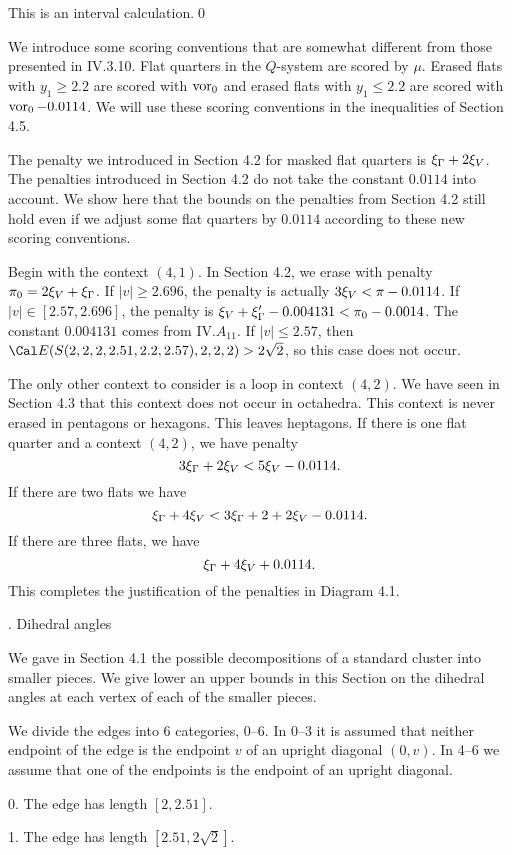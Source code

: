  This is an interval calculation.\qed\enddemo

We introduce some scoring conventions that are somewhat different
from those presented in IV.3.10.
Flat quarters in the $Q$-system are scored by $\mu$.  Erased
flats with $y_1\ge 2.2$ are scored with $\operatorname{vor}_0$ and erased
flats with $y_1\le 2.2$ are scored with $\operatorname{vor}_0-0.0114$.
We will use these scoring conventions in the inequalities of
Section 4.5.

The penalty we introduced in Section 4.2 for masked flat quarters
is $\xi_\Gamma+2\xi_V$.  The penalties introduced in Section 4.2 do not
take the constant $0.0114$ into account.  We show here that the
bounds on the penalties from Section 4.2 still hold even if we
adjust some flat quarters by $0.0114$ according to these new
scoring conventions.  

Begin with the context $(4,1)$. In Section 4.2, we erase with
penalty $\pi_0=2\xi_V+\xi_\Gamma$.
If $|v|\ge 2.696$, the penalty is actually
$3\xi_V < \pi-0.0114$.  If $|v|\in[2.57,2.696]$, the penalty
is $\xi_V+\xi_\Gamma' - 0.004131 < \pi_0-0.0014$.  
The constant $0.004131$ comes from IV.$A_{11}$.
If $|v|\le2.57$, then $\Cal E(S(2,2,2,2.51,2.2,2.57),2,2,2)>2\sqrt2$,
so this case does not occur.

The only other context to consider is a loop in context $(4,2)$.  We
have seen in Section 4.3 that this context does not occur in
octahedra.  This context is never erased in pentagons or hexagons.
This leaves heptagons.  If there is one flat quarter and a context $(4,2)$,
we have penalty
	$$3\xi_\Gamma + 2\xi_V < 5\xi_V - 0.0114.$$
If there are two flats we have
	$$\xi_\Gamma+4\xi_V < 3\xi_\Gamma+2+2\xi_V-0.0114.$$
If there are three flats, we have
	$$\xi_\Gamma+4\xi_V+0.0114.$$
This completes the justification of the penalties in Diagram 4.1.


. Dihedral angles\endsubhead

We gave in Section 4.1 the possible decompositions of a standard cluster
into smaller pieces.  We give lower an upper bounds in this Section
on the dihedral angles at each vertex of each of the smaller pieces.

We divide the edges into 6 categories, 0--6. In 0--3 it is assumed
that neither endpoint of the edge is the endpoint $v$ of an upright
diagonal $(0,v)$.  In 4--6 we assume that one of the endpoints is
the endpoint of an upright diagonal.

0.  The edge has length $[2,2.51]$.  

1.  The edge has length $[2.51,2\sqrt2]$.

